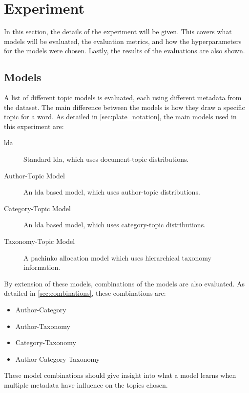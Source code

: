 \section{Experiment}\label{sec:experiment}
In this section, the details of the experiment will be given.
This covers what models will be evaluated, the evaluation metrics, and how the hyperparameters for the models were chosen.
Lastly, the results of the evaluations are also shown.

\subsection{Models}\label{sec:experiment_models}
A list of different topic models is evaluated, each using different metadata from the dataset.
The main difference between the models is how they draw a specific topic for a word.
As detailed in \autoref{sec:plate_notation}, the main models used in this experiment are:
\begin{description}
	\item[\Acrlong{lda}] Standard \gls{lda}, which uses document-topic distributions.
	\item[Author-Topic Model] An \gls{lda} based model, which uses author-topic distributions.
	\item[Category-Topic Model] An \gls{lda} based model, which uses category-topic distributions.
	\item[Taxonomy-Topic Model] A pachinko allocation model which uses hierarchical taxonomy information.
\end{description}

By extension of these models, combinations of the models are also evaluated.
As detailed in \autoref{sec:combinations}, these combinations are:
\begin{itemize}
	\item Author-Category
	\item Author-Taxonomy
	\item Category-Taxonomy
	\item Author-Category-Taxonomy
\end{itemize}
These model combinations should give insight into what a model learns when multiple metadata have influence on the topics chosen.

